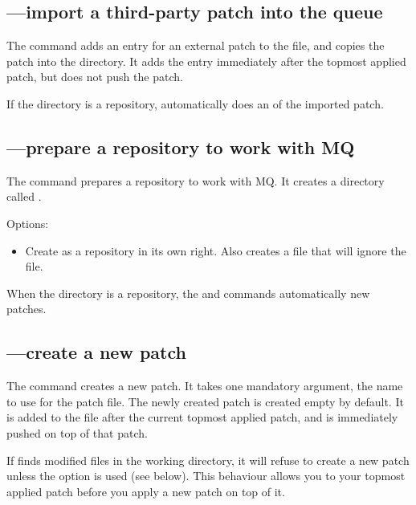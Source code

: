 \subsection{---import a third-party patch into the queue}

The  command adds an entry for an external patch to the
 file, and copies the patch into the
 directory.  It adds the entry immediately after
the topmost applied patch, but does not push the patch.

If the  directory is a repository,
 automatically does an  of the imported
patch.

\subsection{---prepare a repository to work with MQ}

The  command prepares a repository to work with MQ.  It
creates a directory called .

Options:
\begin{itemize}
\item[\hgopt{qinit}{-c}] Create  as a repository
  in its own right.  Also creates a  file that
  will ignore the  file.
\end{itemize}

When the  directory is a repository, the
 and  commands automatically 
new patches.

\subsection{---create a new patch}

The  command creates a new patch.  It takes one mandatory
argument, the name to use for the patch file.  The newly created patch
is created empty by default.  It is added to the 
file after the current topmost applied patch, and is immediately
pushed on top of that patch.

If  finds modified files in the working directory, it will
refuse to create a new patch unless the  option is
used (see below).  This behaviour allows you to  your
topmost applied patch before you apply a new patch on top of it.

